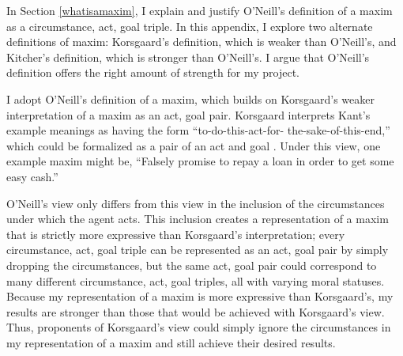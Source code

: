 %
\begin{isabellebody}%
%
%
\isadelimtheory
%
\endisadelimtheory
%
\isatagtheory
%
\endisatagtheory
{\isafoldtheory}%
%
\isadelimtheory
%
\endisadelimtheory
%
\isadelimdocument
%
\endisadelimdocument
%
\isatagdocument
%
\isamarkuptrue%
%
\endisatagdocument
{\isafolddocument}%
%
\isadelimdocument
%
\endisadelimdocument
%
\begin{isamarkuptext}%
In Section \ref{whatisamaxim}, I explain and justify O'Neill's definition of a maxim as a circumstance,
act, goal triple. In this appendix, I explore two alternate definitions of maxim: Korsgaard's definition, 
which is weaker than O'Neill's, and Kitcher's definition, which is stronger than O'Neill's. I argue that 
O'Neill's definition offers the right amount of strength for my project.%
\end{isamarkuptext}\isamarkuptrue%
%
\isadelimdocument
%
\endisadelimdocument
%
\isatagdocument
%
\isamarkuptrue%
%
\endisatagdocument
{\isafolddocument}%
%
\isadelimdocument
%
\endisadelimdocument
%
\begin{isamarkuptext}%
I adopt O'Neill's definition of a maxim, which builds on Korsgaard's weaker interpretation of 
a maxim as an act, goal pair. Korsgaard interprets Kant's example meanings as having the form ``to-do-this-act-for-
the-sake-of-this-end,'' which could be formalized as a pair of an act and goal \citep{actingforareason}.
Under this view, one example maxim might be, ``Falsely promise to repay a loan in order
to get some easy cash.''

O'Neill's view only differs from this view in the inclusion of the circumstances
under which the agent acts. This inclusion creates a representation of a maxim that is strictly more expressive than 
Korsgaard's interpretation; every circumstance, act, goal triple can be represented as an act, goal pair
by simply dropping the circumstances, but the same act, goal pair could correspond to many different
circumstance, act, goal triples, all with varying moral statuses. Because my representation of a maxim
is more expressive than Korsgaard's, my results are stronger than those that would be achieved with 
Korsgaard's view. Thus, proponents of Korsgaard's view could simply ignore the circumstances in my
representation of a maxim and still achieve their desired results. 


\end{isamarkuptext}
\end{isabellebody}
